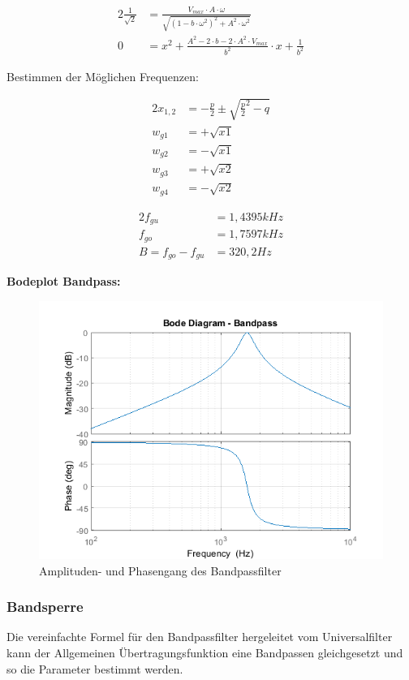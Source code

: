 \begin{alignat}{2}
\frac{1}{\sqrt{2}} &= \frac{V_{max} \cdot A \cdot \omega}{\sqrt{\left(1- b\cdot \omega^2 \right)^2 + A^2 \cdot \omega^2}}\\
0 &= x^2 + \frac{A^2 - 2 \cdot b - 2 \cdot A^2 \cdot V_{max}}{b^2} \cdot x + \frac{1}{b^2}
\end{alignat}

\noindent Bestimmen der Möglichen Frequenzen:

\begin{alignat}{2}
x_{1,2} &= -\frac{p}{2} \pm \sqrt{\frac{p}{2}^2 - q}\\
w_{g1} &= +\sqrt{x1}\\
w_{g2} &= -\sqrt{x1}\\
w_{g3} &= +\sqrt{x2}\\
w_{g4} &= -\sqrt{x2}
\end{alignat}

\begin{alignat}{2}
f_{gu} &= 1,4395 kHz\\
f_{go} &= 1,7597 kHz\\
B = f_{go} - f_{gu} &= 320,2 Hz
\end{alignat}

\textbf{Bodeplot Bandpass:}

\begin{figure}[h]
\centering
\includegraphics[width=0.6\linewidth]{Bilder/Bandpassfilter}
\caption{Amplituden- und Phasengang des Bandpassfilter}
\label{fig:Bandpassfilter}
\end{figure}


\newpage

\subsubsection{Bandsperre}

Die vereinfachte Formel für den Bandpassfilter hergeleitet vom Universalfilter kann der Allgemeinen Übertragungsfunktion eine Bandpassen gleichgesetzt und so die Parameter bestimmt werden.

